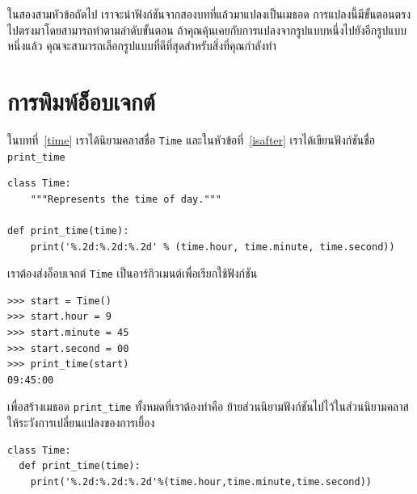 ในสองสามหัวข้อถัดไป เราจะนำฟังก์ชันจากสองบทที่แล้วมาแปลงเป็นเมธอด 
การแปลงนี้มีขั้นตอนตรงไปตรงมาโดยสามารถทำตามลำดับขั้นตอน 
ถ้าคุณคุ้นเคยกับการแปลงจากรูปแบบหนึ่งไปยังอีกรูปแบบหนึ่งแล้ว คุณจะสามารถเลือกรูปแบบที่ดีที่สุดสำหรับสิ่งที่คุณกำลังทำ


\section{การพิมพ์อ็อบเจกต์ } %


ในบทที่~\ref{time} เราได้นิยามคลาสชื่อ {\tt Time} และในหัวข้อที่~\ref{isafter} เราได้เขียนฟังก์ชันชื่อ \verb|print_time|

\begin{verbatim}
class Time:
    """Represents the time of day."""

def print_time(time):
    print('%.2d:%.2d:%.2d' % (time.hour, time.minute, time.second))
\end{verbatim}
%

เราต้องส่งอ็อบเจกต์ {\tt Time} เป็นอาร์กิวเมนต์เพื่อเรียกใช้ฟังก์ชัน

\begin{verbatim}
>>> start = Time()
>>> start.hour = 9
>>> start.minute = 45
>>> start.second = 00
>>> print_time(start)
09:45:00
\end{verbatim}
%

เพื่อสร้างเมธอด \verb|print_time| ทั้งหมดที่เราต้องทำคือ ย้ายส่วนนิยามฟังก์ชันไปไว้ในส่วนนิยามคลาส ให้ระวังการเปลี่ยนแปลงของการเยื้อง

\begin{Verbatim}
class Time:
  def print_time(time):
    print('%.2d:%.2d:%.2d'%(time.hour,time.minute,time.second))
\end{Verbatim}
%

